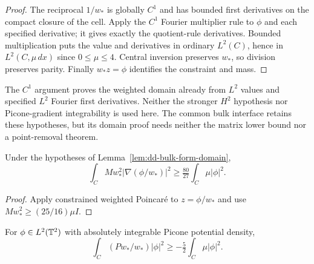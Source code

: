 \begin{proof}
\leanok
The reciprocal $1/w_*$ is globally $C^1$ and has bounded first derivatives
on the compact closure of the cell. Apply the $C^1$ Fourier multiplier
rule to $\phi$ and each specified derivative; it gives exactly the
quotient-rule derivatives. Bounded multiplication puts the value and
derivatives in ordinary $L^2(C)$, hence in $L^2(C,\mu\,dx)$ since
$0\le\mu\le4$. Central inversion preserves $w_*$, so division preserves
parity. Finally $w_*z=\phi$ identifies the constraint and mass.
\end{proof}

\begin{remark}
The $C^1$ argument proves the weighted domain already from $L^2$ values
and specified $L^2$ Fourier first derivatives. Neither the stronger
$H^2$ hypothesis nor Picone-gradient integrability is used here.
The common bulk interface retains these hypotheses, but its domain
proof needs neither the matrix lower bound nor a point-removal theorem.
\end{remark}

\begin{lemma}
\label{lem:dd-bulk-gradient-bound}
\leanok
Under the hypotheses of Lemma~\ref{lem:dd-bulk-form-domain},
\[
 \int_C Mw_*^2|\nabla(\phi/w_*)|^2
 \ge\tfrac{80}{27}\int_C\mu|\phi|^2.
\]
\end{lemma}

\begin{proof}
\leanok
Apply constrained weighted Poincar\'e to $z=\phi/w_*$ and use
$Mw_*^2\ge(25/16)\mu I$.
\end{proof}

\begin{lemma}
\label{lem:dd-bulk-potential-bound}
\leanok
For $\phi\in L^2(\mathbb{T}^2)$ with absolutely integrable Picone potential density,
\[
 \int_C(Pw_*/w_*)|\phi|^2\ge-\tfrac52\int_C\mu|\phi|^2.
\]
\end{lemma}


